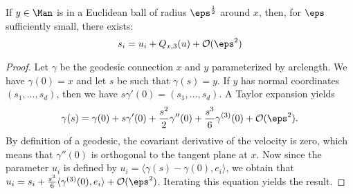 \begin{theorem}
If $y\in\Man$ is in a Euclidean ball of radius $\eps^\frac{1}{2}$ around $x$, then, for $\eps$ sufficiently small, there exists:
\begin{equation}\label{geodOrder3}
s_i=u_i+Q_{x,3}(u)+\mathcal{O}(\eps^2)
\end{equation}
\end{theorem}
\begin{proof}
Let $\gamma$ be the geodesic connection $x$ and $y$ parameterized by arclength. We have $\gamma(0)=x$ and let $s$ be such that $\gamma(s)=y$. If $y$ has normal coordinates $(s_1,\dots,s_d)$, then we have $s\gamma'(0)=(s_1,\dots,s_d)$. A Taylor expansion yields
\begin{equation*}
\gamma(s)=\gamma(0)+s\gamma'(0)+\frac{s^2}{2}\gamma''(0)+\frac{s^3}{6}\gamma^{(3)}(0)+\mathcal{O}(\eps^2).
\end{equation*}
By definition of a geodesic, the covariant derivative of the velocity is zero, which means that $\gamma''(0)$ is orthogonal to the tangent plane at $x$. Now since the parameter $u_i$ is defined by $u_i=\langle\gamma(s)-\gamma(0),e_i\rangle$, we obtain that $u_i=s_i+\frac{s^3}{6}\langle\gamma^{(3)}(0),e_i\rangle+\mathcal{O}(\eps^2)$. Iterating this equation yields the result.
\end{proof}

